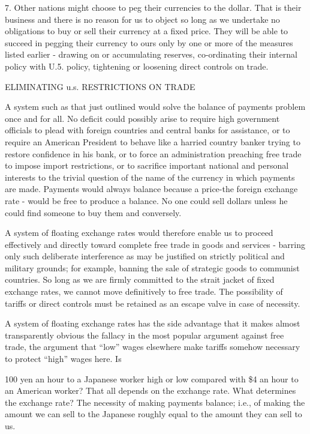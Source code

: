 \documentclass[11pt,openany]{book}
\begin{document}
7. Other nations might choose to peg their currencies to the dollar. That is their business and there is no reason for us to object so long as we undertake no obligations to buy or sell their currency at a fixed price. They will be able to succeed in pegging their currency to ours only by one or more of the measures listed earlier - drawing on or accumulating reserves, co-ordinating their internal policy with U.5. policy, tightening or loosening direct controls on trade.

ELIMINATING u.s. RESTRICTIONS ON TRADE

A system such as that just outlined would solve the balance of payments problem once and for all. No deficit could possibly arise to require high government officials to plead with foreign countries and central banks for assistance, or to require an American President to behave like a harried country banker trying to restore confidence in his bank, or to force an administration preaching free trade to impose import restrictions, or to sacrifice important national and personal interests to the trivial question of the name of the currency in which payments are made. Payments would always balance because a price-the foreign exchange rate - would be free to produce a balance. No one could sell dollars unless he could find someone to buy them and conversely.

A system of floating exchange rates would therefore enable us to proceed effectively and directly toward complete free trade in goods and services - barring only such deliberate interference as may be justified on strictly political and military grounds; for example, banning the sale of strategic goods to communist countries. So long as we are firmly committed to the strait jacket of fixed exchange rates, we cannot move definitively to free trade. The possibility of tariffs or direct controls must be retained as an escape valve in case of necessity.

A system of floating exchange rates has the side advantage that it makes almost transparently obvious the fallacy in the most popular argument against free trade, the argument that ``low'' wages elsewhere make tariffs somehow necessary to protect ``high'' wages here. Is

100 yen an hour to a Japanese worker high or low compared with \$4 an hour to an American worker? That all depends on the exchange rate. What determines the exchange rate? The necessity of making payments balance; i.e., of making the amount we can sell to the Japanese roughly equal to the amount they can sell to us.
\end{document}
